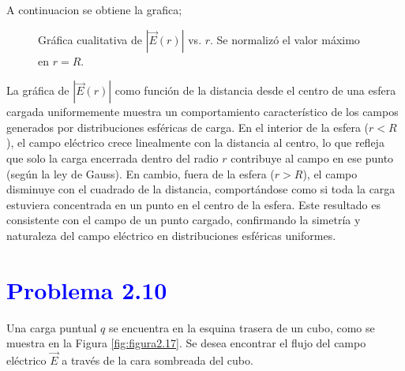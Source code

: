 \documentclass[12pt]{article}
\newcommand{\question}[1]{\textcolor{blue}{\textbf{#1}}}
\begin{document}
A continuacion se obtiene la grafica;
\begin{figure}[H]
    \centering
    \caption{Gráfica cualitativa de \( |\vec{E}(r)| \) vs. \( r \). Se normalizó el valor máximo en \( r = R \).}
\end{figure}
La gráfica de \( |\vec{E}(r)| \) como función de la distancia desde el centro de una esfera cargada uniformemente muestra un comportamiento característico de los campos generados por distribuciones esféricas de carga. En el interior de la esfera (\( r < R \)), el campo eléctrico crece linealmente con la distancia al centro, lo que refleja que solo la carga encerrada dentro del radio \( r \) contribuye al campo en ese punto (según la ley de Gauss). En cambio, fuera de la esfera (\( r > R \)), el campo disminuye con el cuadrado de la distancia, comportándose como si toda la carga estuviera concentrada en un punto en el centro de la esfera. Este resultado es consistente con el campo de un punto cargado, confirmando la simetría y naturaleza del campo eléctrico en distribuciones esféricas uniformes.

\section*{\question{Problema 2.10}}

Una carga puntual \( q \) se encuentra en la esquina trasera de un cubo, como se muestra en la Figura \ref{fig:figura2.17}. Se desea encontrar el flujo del campo eléctrico \( \vec{E} \) a través de la cara sombreada del cubo.
\end{document}
